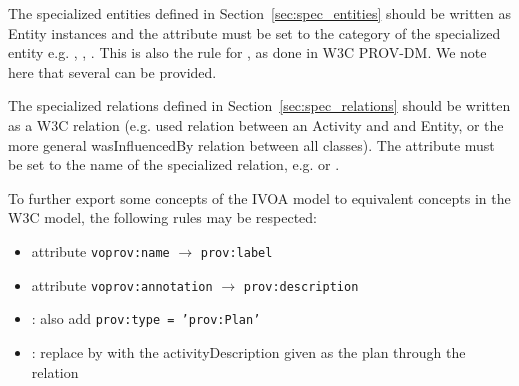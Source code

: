 The specialized entities defined in Section~\ref{sec:spec_entities} should be written as Entity instances and the attribute  must be set to the category of the specialized entity e.g. , , . This is also the rule for , as done in W3C PROV-DM. We note here that several  can be provided.

The specialized relations defined in Section~\ref{sec:spec_relations} should be written as a W3C relation (e.g. used relation between an Activity and and Entity, or the more general wasInfluencedBy relation between all classes). The attribute  must be set to the name of the specialized relation, e.g.  or  .

To further export some concepts of the IVOA model to equivalent concepts in the W3C model, the following rules may be respected:

\begin{itemize}
\item attribute \texttt{voprov:name} $\rightarrow$ \texttt{prov:label}
\item attribute \texttt{voprov:annotation} $\rightarrow$ \texttt{prov:description}
\item {}: also add \texttt{prov:type = 'prov:Plan'}
\item {}: replace by  with the activityDescription given as the plan through the  relation
\end{itemize}




